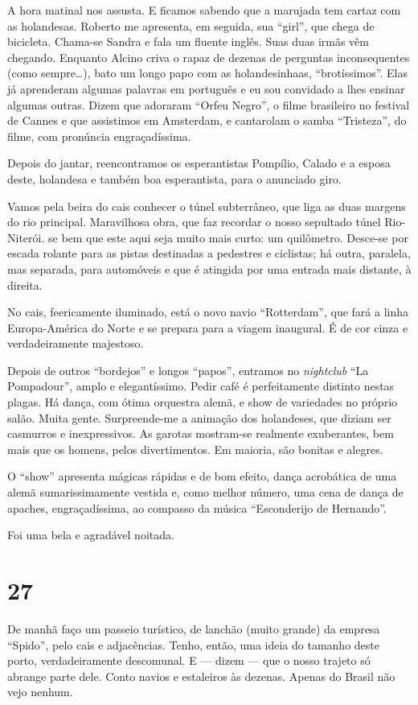A hora matinal nos assusta. E ficamos sabendo que a marujada tem cartaz com as holandesas. Roberto me apresenta, em seguida, sua ``girl'', que chega de bicicleta. Chama-se Sandra e fala um fluente inglês. Suas duas irmãs vêm chegando. Enquanto Alcino criva o rapaz de dezenas de perguntas inconsequentes (como sempre\ldots), bato um longo papo com as holandesinhaas, ``brotíssimos''. Elas já aprenderam algumas palavras em português e eu sou convidado a lhes ensinar algumas outras. Dizem que adoraram ``Orfeu Negro'', o filme brasileiro no festival de Cannes e que assistimos em Amsterdam, e cantarolam o samba ``Tristeza'', do filme, com pronúncia engraçadíssima.

Depois do jantar, reencontramos os esperantistas Pompílio, Calado e a esposa deste, holandesa e também boa esperantista, para o anunciado giro.

Vamos pela beira do cais conhecer o túnel subterrâneo, que liga as duas margens do rio principal. Maravilhosa obra, que faz recordar o nosso sepultado túnel Rio-Niterói. se bem que este aqui seja muito mais curto: um quilômetro. Desce-se por escada rolante para as pistas destinadas a pedestres e ciclistas; há outra, paralela, mas separada, para automóveis e que é atingida por uma entrada mais distante, à direita.

No cais, feericamente iluminado, está o novo navio ``Rotterdam'', que fará a linha Europa-América do Norte e se prepara para a viagem inaugural. É de cor cinza e verdadeiramente majestoso.

Depois de outros ``bordejos'' e longos ``papos'', entramos no \textit{nightclub} ``La Pompadour'', amplo e elegantíssimo. Pedir café é perfeitamente distinto nestas plagas. Há dança, com ótima orquestra alemã, e show de variedades no próprio salão. Muita gente. Surpreende-me a animação dos holandeses, que diziam ser casmurros e inexpressivos. As garotas mostram-se realmente exuberantes, bem mais que os homens, pelos divertimentos. Em maioria, são bonitas e alegres.

O ``show'' apresenta mágicas rápidas e de bom efeito, dança acrobática de uma alemã sumarissimamente vestida e, como melhor número, uma cena de dança de apaches, engraçadíssima, ao compasso da música ``Esconderijo de Hernando''.

Foi uma bela e agradável noitada.

\section*{27 \adfflatleafright {}}
De manhã faço um passeio turístico, de lanchão (muito grande) da empresa ``Spido'', pelo cais e adjacências. Tenho, então, uma ideia do tamanho deste porto, verdadeiramente descomunal. E --- dizem --- que o nosso trajeto só abrange parte dele. Conto navios e estaleiros às dezenas. Apenas do Brasil não vejo nenhum.

